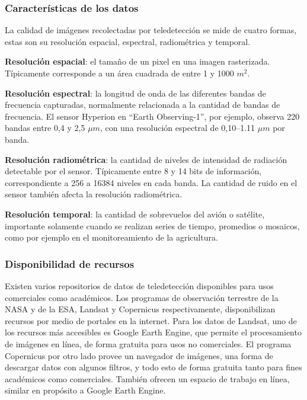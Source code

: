 \subsubsection{Características de los datos}

La calidad de imágenes recolectadas por teledetección se mide de cuatro formas, estas son su resolución espacial,
espectral, radiométrica y temporal.

{\bf Resolución espacial}: el tamaño de un pixel en una imagen rasterizada. Típicamente corresponde a un área cuadrada
de entre 1 y 1000 $m^2$.

{\bf Resolución espectral}: la longitud de onda de las diferentes bandas de frecuencia capturadas, normalmente
relacionada a la cantidad de bandas de frecuencia. El sensor Hyperion en ``Earth Observing-1'', por ejemplo, observa 220
bandas entre 0,4 y 2,5 $\mu m$, con una resolución espectral de 0,10--1.11 $\mu m$ por banda.
\autocite{earth-observatory-earth-observing-1}

{\bf Resolución radiométrica}: la cantidad de niveles de intensidad de radiación detectable por el sensor. Típicamente
entre 8 y 14 bits de información, correspondiente a 256 a 16384 niveles en cada banda. La cantidad de ruido en el
sensor también afecta la resolución radiométrica.

{\bf Resolución temporal}: la cantidad de sobrevuelos del avión o satélite, importante solamente cuando se realizan
series de tiempo, promedios o mosaicos, como por ejemplo en el monitoreamiento de la agricultura.

\subsubsection{Disponibilidad de recursos}

Existen varios repositorios de datos de teledetección disponibles para usos comerciales como académicos. Los programas
de observación terrestre de la NASA y de la ESA, Landsat y Copernicus respectivamente, disponibilizan recursos por
medio de portales en la internet. Para los datos de Landsat, uno de los recursos más accesibles es Google Earth Engine,
que permite el procesamiento de imágenes en línea, de forma gratuita para usos no comerciales.
\autocite{landsat-data-access} El programa Copernicus por otro lado provee un navegador de imágenes, una forma de
descargar datos con algunos filtros, y todo esto de forma gratuita tanto para fines académicos como comerciales.
\autocite{copernicus-licences} También ofrecen un espacio de trabajo en línea, similar en propósito a Google Earth
Engine. \autocite{copernicus-ds-about}
